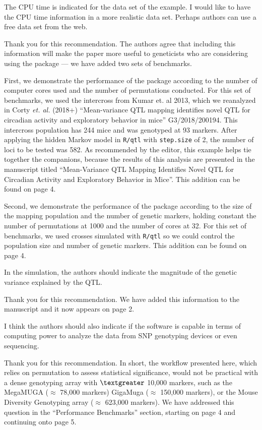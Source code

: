 \documentclass[11pt]{article}
\newcommand{\ReviewerQuestion}[2]{
  \vspace{5pt}\goodbreak
  \noindent\fbox{Reviewer:~#1} #2
  \normalfont\par
}
\newcommand{\Response}[1]{
  \goodbreak
  \textcolor{blue!50!black}{#1}
  \normalfont\par
}
\newcommand{\CortyReanalysisPaper}{Corty \emph{et. al.} (2018+) ``Mean-variance QTL mapping identifies novel QTL for circadian activity and exploratory behavior in mice'' G3/2018/200194\xspace}
\begin{document}
\ReviewerQuestion{1.3}{
  The CPU time is indicated for the data set of the example.
  I would like to have the CPU time information in a more realistic data set.
  Perhaps authors can use a free data set from the web.
}
\Response{
  Thank you for this recommendation.
  The authors agree that including this information will make the paper more useful to geneticists who are considering using the package --- we have added two sets of benchmarks.
}
\Response{
  First, we demonstrate the performance of the package according to the number of computer cores used and the number of permutations conducted.
  For this set of benchmarks, we used the intercross from Kumar et. al 2013, which we reanalyzed in \CortyReanalysisPaper.
  This intercross population has 244 mice and was genotyped at 93 markers.
  After applying the hidden Markov model in \texttt{R/qtl} with \texttt{step.size} of 2, the number of loci to be tested was 582.
  As recommended by the editor, this example helps tie together the companions, because the results of this analysis are presented in the manuscript titled ``Mean-Variance QTL Mapping Identifies Novel QTL for Circadian Activity and Exploratory Behavior in Mice''.
  This addition can be found on page 4.
}
\Response{
  Second, we demonstrate the performance of the package according to the size of the mapping population and the number of genetic markers, holding constant the number of permutations at 1000 and the number of cores at 32.
  For this set of benchmarks, we used crosses simulated with \texttt{R/qtl} so we could control the population size and number of genetic markers.
  This addition can be found on page 4.
}

\ReviewerQuestion{1.4}{
  In the simulation, the authors should indicate the magnitude of the genetic variance explained by the QTL.
}
\Response{
  Thank you for this recommendation.
  We have added this information to the manuscript and it now appears on page 2.
}


\ReviewerQuestion{1.5}{
  I think the authors should also indicate if the software is capable in terms of computing power to analyze the data from SNP genotyping devices or even sequencing.
}

\Response{
  Thank you for this recommendation.
  In short, the workflow presented here, which relies on permutation to assess statistical significance, would not be practical with a dense genotyping array with $\textgreater$ 10,000 markers, such as the MegaMUGA ($\approx$ 78,000 markers) GigaMuga ($\approx$ 150,000 markers), or the Mouse Diversity Genotyping array ($\approx$ 623,000 markers).
  We have addressed this question in the ``Performance Benchmarks'' section, starting on page 4 and continuing onto page 5.
}
\end{document}
